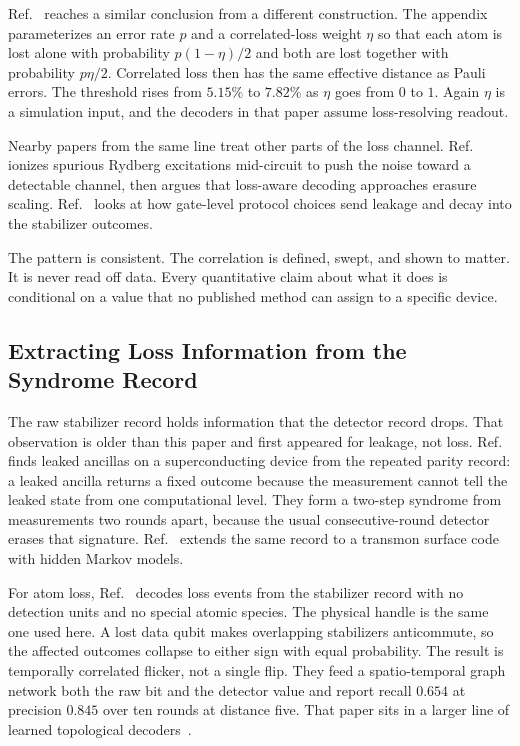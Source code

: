 \documentclass{ieeeaccess}
\begin{document}
Ref.~\cite{liu2026optimaldistanceatomloss} reaches a similar conclusion from a
different construction. The appendix parameterizes an error rate $p$ and a
correlated-loss weight $\eta$ so that each atom is lost alone with probability
$p(1-\eta)/2$ and both are lost together with probability $p\eta/2$. Correlated
loss then has the same effective distance as Pauli errors. The threshold rises
from $5.15\%$ to $7.82\%$ as $\eta$ goes from $0$ to $1$. Again $\eta$ is a
simulation input, and the decoders in that paper assume loss-resolving readout.

Nearby papers from the same line treat other parts of the loss channel.
Ref.~\cite{pecorari2026lossbiased} ionizes spurious Rydberg excitations
mid-circuit to push the noise toward a detectable channel, then argues that
loss-aware decoding approaches erasure scaling.
Ref.~\cite{jandura2026stabilizermeasurements} looks at how gate-level protocol
choices send leakage and decay into the stabilizer outcomes.

The pattern is consistent. The correlation is defined, swept, and shown to
matter. It is never read off data. Every quantitative claim about what it does
is conditional on a value that no published method can assign to a specific
device.

\subsection{Extracting Loss Information from the Syndrome Record}
\label{sec:rel-syndrome}

The raw stabilizer record holds information that the detector record drops.
That observation is older than this paper and first appeared for leakage, not
loss. Ref.~\cite{bultink2020repetitiveparity} finds leaked ancillas on a
superconducting device from the repeated parity record: a leaked ancilla
returns a fixed outcome because the measurement cannot tell the leaked state
from one computational level. They form a two-step syndrome from measurements
two rounds apart, because the usual consecutive-round detector erases that
signature. Ref.~\cite{varbanov2020leakagedetection} extends the same record to
a transmon surface code with hidden Markov models.

For atom loss, Ref.~\cite{wang2026aiqubitloss} decodes loss events from the
stabilizer record with no detection units and no special atomic species. The
physical handle is the same one used here. A lost data qubit makes overlapping
stabilizers anticommute, so the affected outcomes collapse to either sign with
equal probability. The result is temporally correlated flicker, not a single
flip. They feed a spatio-temporal graph network both the raw bit and the
detector value and report recall $0.654$ at precision $0.845$ over ten rounds
at distance five. That paper sits in a larger line of learned topological
decoders~\cite{torlai2017neuraldecoder,varsamopoulos2018feedforward,baireuther2018mlassisted,chamberland2018deepneuraldecoders,bausch2024alphaqubit}.
\end{document}
